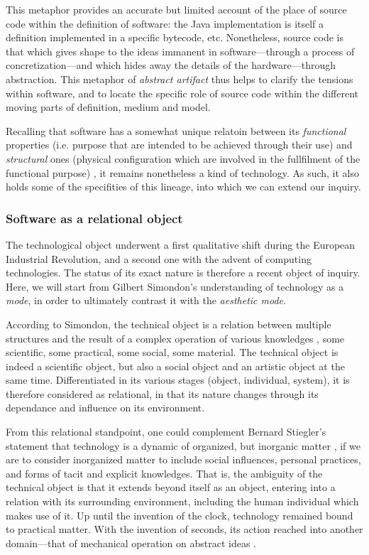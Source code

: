 This metaphor provides an accurate but limited account of the place of source code within the definition of software: the Java implementation is itself a definition implemented in a specific bytecode, etc. Nonetheless, source code is that which gives shape to the ideas immanent in software—through a process of concretization—and which hides away the details of the hardware—through abstraction. This metaphor of \emph{abstract artifact} thus helps to clarify the tensions within software, and to locate the specific role of source code within the different moving parts of definition, medium and model.

Recalling that software has a somewhat unique relatoin between its \emph{functional} properties (i.e. purpose that are intended to be achieved through their use) and \emph{structural} ones (physical configuration which are involved in the fullfilment of the functional purpose) \citep{turner_computational_2018}, it remains nonetheless a kind of technology. As such, it also holds some of the specifities of this lineage, into which we can extend our inquiry.

\subsubsection{Software as a relational object} %
\label{subsec:software_relational}

The technological object underwent a first qualitative shift during the European Industrial Revolution, and a second one with the advent of computing technologies. The status of its exact nature is therefore a recent object of inquiry. Here, we will start from Gilbert Simondon's understanding of technology as a \emph{mode}, in order to ultimately contrast it with the \emph{aesthetic mode}.

According to Simondon, the technical object is a relation between multiple structures and the result of a complex operation of various knowledges \citep{simondon_mode_1958}, some scientific, some practical, some social, some material. The technical object is indeed a scientific object, but also a social object and an artistic object at the same time. Differentiated in its various stages (object, individual, system), it is therefore considered as relational, in that its nature changes through its dependance and influence on its environment.

From this relational standpoint, one could complement Bernard Stiegler's statement that technology is a dynamic of organized, but inorganic matter \citep{stiegler_technics_1998}, if we are to consider inorganized matter to include social influences, personal practices, and forms of tacit and explicit knowledges. That is, the ambiguity of the technical object is that it extends beyond itself as an object, entering into a relation with its surrounding environment, including the human individual which makes use of it. Up until the invention of the clock, technology remained bound to practical matter. With the invention of seconds, its action reached into another domain—that of mechanical operation on abstract ideas \citep{mumford_technics_1934}.

